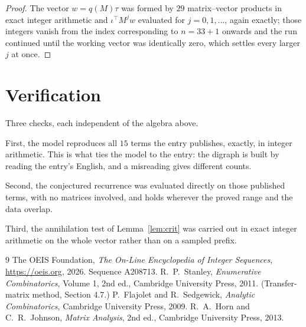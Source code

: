 \documentclass[11pt,a4paper]{article}
\theoremstyle{plain}
\theoremstyle{definition}
\begin{document}
\begin{proof}
The vector $w=q(M)\tau$ was formed by $29$ matrix--vector products in exact integer
arithmetic and $\iota^{\!\top}M^{j}w$ evaluated for $j=0,1,\dots$, again exactly; those
integers vanish from the index corresponding to $n=33+1$ onwards and the run continued
until the working vector was identically zero, which settles every larger $j$ at once.
\end{proof}

\section{Verification}

Three checks, each independent of the algebra above.

First, the model reproduces all $15$ terms the entry publishes, exactly, in integer
arithmetic. This is what ties the model to the entry: the digraph is built by reading the
entry's English, and a misreading gives different counts.

Second, the conjectured recurrence was evaluated directly on those published terms, with no
matrices involved, and holds wherever the proved range and the data overlap.

Third, the annihilation test of Lemma~\ref{lem:crit} was carried out in exact integer
arithmetic on the whole vector rather than on a sampled prefix.

\begin{thebibliography}{9}
 The OEIS Foundation, \emph{The On-Line Encyclopedia of Integer
Sequences}, \url{https://oeis.org}, 2026. Sequence A208713.
 R.~P.~Stanley, \emph{Enumerative Combinatorics}, Volume 1, 2nd ed.,
Cambridge University Press, 2011. (Transfer-matrix method, Section 4.7.)
 P.~Flajolet and R.~Sedgewick, \emph{Analytic Combinatorics}, Cambridge
University Press, 2009.
 R.~A.~Horn and C.~R.~Johnson, \emph{Matrix Analysis}, 2nd ed., Cambridge
University Press, 2013.
\end{thebibliography}
\end{document}
